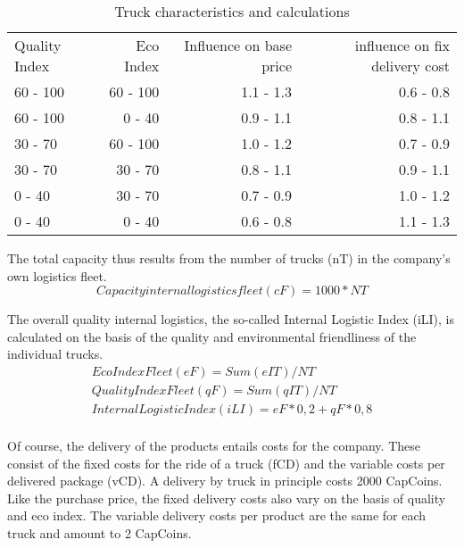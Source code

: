 \begin{table}[ht]
    \centering
    \begin{tabular}{|l|r|r|r|}
    \hline
    Quality Index & Eco Index & Influence on base price & influence on fix delivery cost \\
    60 - 100      & 60 - 100   & 1.1 - 1.3   & 0.6 - 0.8       \\
    60 - 100      & 0 - 40     & 0.9 - 1.1   & 0.8 - 1.1       \\
    30 - 70       & 60 - 100   & 1.0 - 1.2   & 0.7 - 0.9       \\
    30 - 70       & 30 - 70    & 0.8 - 1.1   & 0.9 - 1.1       \\
    0 - 40        & 30 - 70    & 0.7 - 0.9   & 1.0 - 1.2       \\
    0 - 40        & 0 - 40     & 0.6 - 0.8   & 1.1 - 1.3       \\
    \hline
    \end{tabular}
    \caption{Truck characteristics and calculations}
    \label{Truck_characteristics}
\end{table}

The total capacity thus results from the number of trucks (nT) in the company's own logistics fleet. 
\begin{equation}
    Capacity internal logistics fleet (cF) = 1000 * NT
\end{equation}

The overall quality internal logistics, the so-called Internal Logistic Index (iLI), is calculated on the basis of the quality and environmental friendliness of the individual trucks.  
\begin{equation}
\begin{aligned}
    Eco Index Fleet (eF) = Sum (eIT) / NT \\
    Quality Index Fleet (qF) = Sum (qIT) / NT \\
    Internal Logistic Index (iLI) = eF * 0,2 + qF * 0,8 \\
\end{aligned}
\end{equation}

Of course, the delivery of the products entails costs for the company. These consist of the fixed costs for the ride of a truck (fCD) and the variable costs per delivered package (vCD). 
A delivery by truck in principle costs 2000 CapCoins. Like the purchase price, the fixed delivery costs also vary on the basis of quality and eco index. The variable delivery costs per product are the same for each truck and amount to 2 CapCoins.

